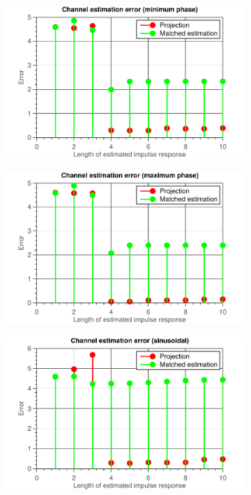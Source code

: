 \documentclass[11pt,titlepage]{report}
\begin{document}
\begin{figure}[H]
	\centering
	\begin{subfigure}{0.49\textwidth}
		\includegraphics[width=\textwidth]{../../deliverable-7-resources/figures/ass-1/report-8-9-10/report-9-noise-0.1/ass-1-report-9-minimum-phase.pdf}
	\end{subfigure}
	\begin{subfigure}{0.49\textwidth}
		\includegraphics[width=\textwidth]{../../deliverable-7-resources/figures/ass-1/report-8-9-10/report-9-noise-0.1/ass-1-report-9-maximum-phase.pdf}
	\end{subfigure}
	\begin{subfigure}{0.49\textwidth}
		\includegraphics[width=\textwidth]{../../deliverable-7-resources/figures/ass-1/report-8-9-10/report-9-noise-0.1/ass-1-report-9-sinusoidal.pdf}

\end{subfigure}
\end{figure}
\end{document}
